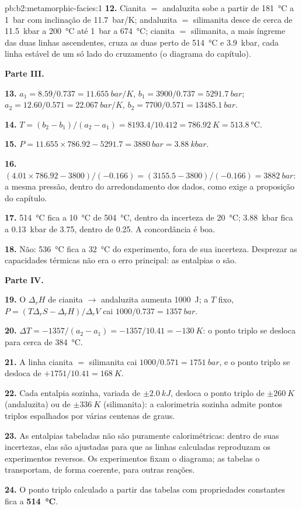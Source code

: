 \begin{solution}{pb:b2:metamorphic-facies:1}
\textbf{12.} Cianita $=$ andaluzita sobe a partir de \qty{181}{\celsius} a \qty{1}{bar} com
inclinação de \qty{11.7}{bar/K}; andaluzita $=$ silimanita desce de cerca de \qty{11.5}{kbar} a
\qty{200}{\celsius} até \qty{1}{bar} a \qty{674}{\celsius}; cianita $=$ silimanita, a
mais íngreme das duas linhas ascendentes, cruza as duas perto de \qty{514}{\celsius} e \qty{3.9}{kbar}, cada linha estável de
um só lado do cruzamento (o diagrama do capítulo).

\noindent\textbf{Parte III.}

\textbf{13.} $a_1 = 8.59/0.737 = \qty{11.655}{bar/K}$, $b_1 = 3900/0.737 =
\qty{5291.7}{bar}$; $a_2 = 12.60/0.571 = \qty{22.067}{bar/K}$, $b_2 = 7700/0.571 =
\qty{13485.1}{bar}$.

\textbf{14.} $T = (b_2 - b_1)/(a_2 - a_1) = 8193.4/10.412 = \qty{786.92}{K} =
\qty{513.8}{\celsius}$.

\textbf{15.} $P = 11.655\times786.92 - 5291.7 = \qty{3880}{bar} = \qty{3.88}{kbar}$.

\textbf{16.} $(4.01\times786.92 - 3800)/(-0.166) = (3155.5 - 3800)/(-0.166) =
\qty{3882}{bar}$: a mesma pressão, dentro do arredondamento dos dados, como exige a proposição do capítulo.

\textbf{17.} \qty{514}{\celsius} fica a \qty{10}{\celsius} de \qty{504}{\celsius}, dentro
da incerteza de \qty{20}{\celsius}; \qty{3.88}{kbar} fica a \qty{0.13}{kbar} de 3.75,
dentro de 0.25. A concordância é boa.

\textbf{18.} Não: \qty{536}{\celsius} fica a \qty{32}{\celsius} do experimento, fora de sua
incerteza. Desprezar as capacidades térmicas não era o erro principal: as entalpias o são.

\noindent\textbf{Parte IV.}

\textbf{19.} O $\Delta_r H$ de cianita $\to$ andaluzita aumenta \qty{1000}{J}; a $T$
fixo, $P = (T\Delta_r S - \Delta_r H)/\Delta_r V$ cai $1000/0.737 = \qty{1357}{bar}$.

\textbf{20.} $\Delta T = -1357/(a_2 - a_1) = -1357/10.41 = \qty{-130}{K}$: o ponto triplo
se desloca para cerca de \qty{384}{\celsius}.

\textbf{21.} A linha cianita $=$ silimanita cai $1000/0.571 = \qty{1751}{bar}$, e
o ponto triplo se desloca de $+1751/10.41 = \qty{+168}{K}$.

\textbf{22.} Cada entalpia sozinha, variada de $\pm\qty{2.0}{kJ}$, desloca o ponto triplo de
$\pm\qty{260}{K}$ (andaluzita) ou de $\pm\qty{336}{K}$ (silimanita): a calorimetria sozinha admite
pontos triplos espalhados por várias centenas de graus.

\textbf{23.} As entalpias tabeladas não são puramente calorimétricas: dentro de suas
incertezas, elas são ajustadas para que as linhas calculadas reproduzam os experimentos reversos.
Os experimentos fixam o diagrama; as tabelas o transportam, de forma coerente, para outras reações.

\textbf{24.} O ponto triplo calculado a partir das tabelas com propriedades constantes fica a
\textbf{\qty[text-series-to-math=true]{514}{\celsius}}.
\end{solution}
